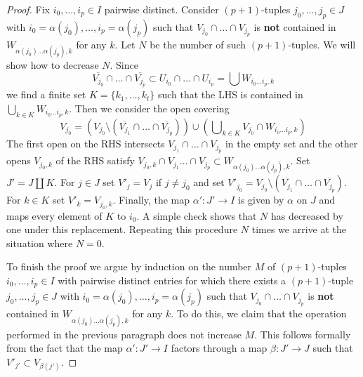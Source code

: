 \begin{proof}
\medskip\noindent
Fix $i_0, \ldots, i_p \in I$ pairwise distinct. Consider $(p + 1)$-tuples
$j_0, \ldots, j_p \in J$ with $i_0 = \alpha(j_0), \ldots, i_p = \alpha(j_p)$
such that $V_{j_0} \cap \ldots \cap V_{j_p}$
is {\bf not} contained in $W_{\alpha(j_0) \ldots \alpha(j_p), k}$ for any $k$.
Let $N$ be the number of such $(p + 1)$-tuples. We will show how to decrease
$N$. Since
$$
\overline{V_{j_0}} \cap \ldots \cap \overline{V_{j_p}} \subset
U_{i_0} \cap \ldots \cap U_{i_p} = \bigcup W_{i_0 \ldots i_p, k}
$$
we find a finite set $K = \{k_1, \ldots, k_t\}$ such that the LHS
is contained in $\bigcup_{k \in K} W_{i_0 \ldots i_p, k}$.
Then we consider the open covering
$$
V_{j_0} =
(V_{j_0} \setminus (\overline{V_{j_1}} \cap \ldots \cap \overline{V_{j_p}}))
\cup (\bigcup\nolimits_{k \in K} V_{j_0} \cap W_{i_0 \ldots i_p, k})
$$
The first open on the RHS intersects $V_{j_1} \cap \ldots \cap V_{j_p}$
in the empty set and the other opens $V_{j_0, k}$ of the RHS
satisfy $V_{j_0, k} \cap V_{j_1} \ldots \cap V_{j_p} \subset
W_{\alpha(j_0) \ldots \alpha(j_p), k}$.
Set $J' = J \amalg K$. For $j \in J$ set $V'_j = V_j$ if $j \not = j_0$
and set $V'_{j_0} =
V_{j_0} \setminus (\overline{V_{j_1}} \cap \ldots \cap \overline{V_{j_p}})$.
For $k \in K$ set $V'_k = V_{j_0, k}$. Finally, the map $\alpha' : J' \to I$
is given by $\alpha$ on $J$ and maps every element of $K$ to $i_0$.
A simple check shows that $N$ has decreased by one under this replacement.
Repeating this procedure $N$ times we arrive at the situation where
$N = 0$.

\medskip\noindent
To finish the proof we argue by induction on the number $M$ of $(p + 1)$-tuples
$i_0, \ldots, i_p \in I$ with pairwise distinct entries for which there exists
a $(p + 1)$-tuple $j_0, \ldots, j_p \in J$ with
$i_0 = \alpha(j_0), \ldots, i_p = \alpha(j_p)$ such that
$V_{j_0} \cap \ldots \cap V_{j_p}$ is {\bf not} contained in
$W_{\alpha(j_0) \ldots \alpha(j_p), k}$ for any $k$. To do this, we
claim that the operation performed in the previous paragraph does not
increase $M$. This follows formally from the fact that the map
$\alpha' : J' \to I$ factors through a map $\beta : J' \to J$
such that $V'_{j'} \subset V_{\beta(j')}$.
\end{proof}

